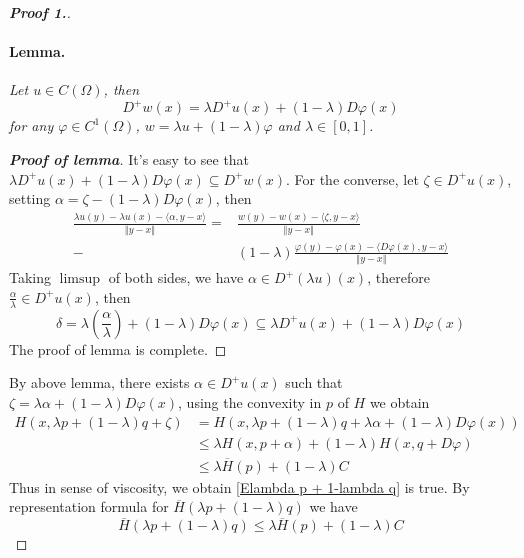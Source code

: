 \documentclass[12pt, oneside]{amsart}  	%
\begin{document}
\begin{proof}[\textbf{Proof 1.}]
\paragraph{\textbf{Lemma.}} \textit{Let $u\in C(\Omega)$, then
\begin{equation*}
D^+w(x) = \lambda D^+u(x) + (1-\lambda)D\varphi(x)
\end{equation*}
for any $\varphi\in C^1(\Omega)$, $w = \lambda u + (1-\lambda)\varphi$ and $\lambda\in [0,1]$.}\\
\vspace*{0.3cm}
\begin{proof}[\textbf{Proof of lemma}] It's easy to see that $\lambda D^+u(x) + (1-\lambda)D\varphi(x) \subseteq D^+w(x)$. For the converse, let $\zeta\in D^+u(x)$, setting $\alpha = \zeta - (1-\lambda)D\varphi(x)$, then
\begin{align*}
\frac{\lambda u(y) - \lambda u(x) - \langle \alpha,y-x \rangle}{\Vert y-x\Vert} = &\frac{w(y) - w(x) - \langle \zeta,y-x \rangle}{\Vert y-x\Vert} \\
- &(1-\lambda)\frac{\varphi(y) - \varphi(x) - \langle D\varphi(x),y-x\rangle}{\Vert y-x\Vert}
\end{align*}
Taking $\limsup$ of both sides, we have $\alpha\in D^+(\lambda u)(x)$, therefore $\frac{\alpha}{\lambda}\in D^+u(x)$, then
\begin{equation*}
\delta = \lambda\left( \frac{\alpha}{\lambda}\right) + (1-\lambda)D\varphi(x) \subseteq \lambda D^+u(x) + (1-\lambda)D\varphi(x)
\end{equation*}
The proof of lemma is complete.
\end{proof}
\vspace*{0.2cm}
By above lemma, there exists $\alpha\in D^+u(x)$ such that $\zeta = \lambda \alpha + (1-\lambda)D\varphi(x)$, using the convexity in $p$ of $H$ we obtain
\begin{align*}
H\left(x,\lambda p +(1-\lambda)q + \zeta\right) &= H\left(x,\lambda p +(1-\lambda)q + \lambda \alpha + (1-\lambda)D\varphi(x)\right) \\
&\leq \lambda H(x,p+\alpha) + (1-\lambda)H(x,q+D\varphi) \\
&\leq \lambda \overline{H}(p) + (1-\lambda)C
\end{align*}
Thus in sense of viscosity, we obtain \eqref{Elambda p + 1-lambda q} is true. By representation formula for $\overline{H}\left(\lambda p + (1-\lambda)q\right)$ we have
\begin{equation*}
\overline{H}\left(\lambda p + (1-\lambda)q\right) \leq \lambda \overline{H}(p) + (1-\lambda)C

\end{equation*}
\end{proof}
\end{document}
